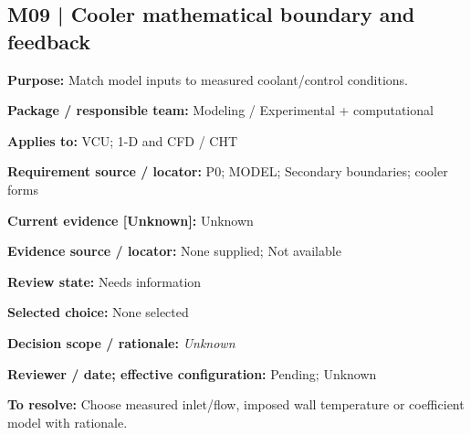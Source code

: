 \documentclass[11pt]{article}
\begin{document}
\par\noindent\begin{minipage}{\textwidth}\small\setlength{\parskip}{2pt}
\subsection*{M09 | Cooler mathematical boundary and feedback}
\textbf{Purpose:} Match model inputs to measured coolant/control conditions.\par
\textbf{Package / responsible team:} Modeling / Experimental + computational\par
\textbf{Applies to:} VCU; 1-D and CFD / CHT\par
\textbf{Requirement source / locator:} P0; MODEL; Secondary boundaries; cooler forms\par
\textbf{Current evidence [Unknown]:} Unknown\par
\textbf{Evidence source / locator:} None supplied; Not available\par
\textbf{Review state:} Needs information\par
\textbf{Selected choice:} None selected\par
\textbf{Decision scope / rationale:} \textit{Unknown}\par
\textbf{Reviewer / date; effective configuration:} Pending; Unknown\par
\textbf{To resolve:} Choose measured inlet/flow, imposed wall temperature or coefficient model with rationale.\par
\end{minipage}\par\vspace{5pt}
\end{document}
